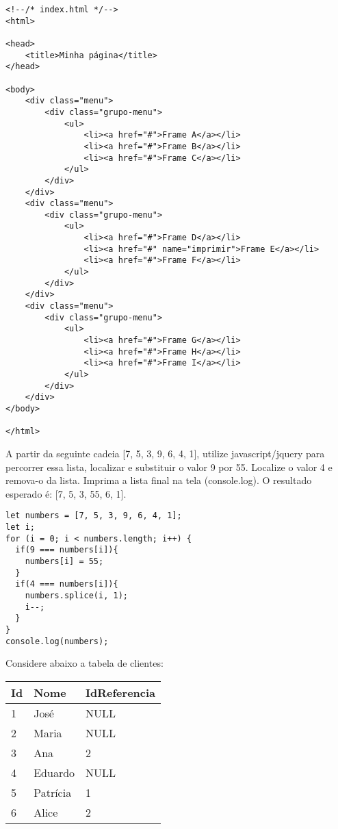 \documentclass[a4 paper]{article}
\begin{document}
\begin{verbatim}
<!--/* index.html */-->
<html>

<head>
    <title>Minha página</title>
</head>

<body>
    <div class="menu">
        <div class="grupo-menu">
            <ul>
                <li><a href="#">Frame A</a></li>
                <li><a href="#">Frame B</a></li>
                <li><a href="#">Frame C</a></li>
            </ul>
        </div>
    </div>
    <div class="menu">
        <div class="grupo-menu">
            <ul>
                <li><a href="#">Frame D</a></li>
                <li><a href="#" name="imprimir">Frame E</a></li>
                <li><a href="#">Frame F</a></li>
            </ul>
        </div>
    </div>
    <div class="menu">
        <div class="grupo-menu">
            <ul>
                <li><a href="#">Frame G</a></li>
                <li><a href="#">Frame H</a></li>
                <li><a href="#">Frame I</a></li>
            </ul>
        </div>
    </div>
</body>

</html>
\end{verbatim}


\vspace{5mm}

A partir da seguinte cadeia [7, 5, 3, 9, 6, 4, 1], utilize javascript/jquery para percorrer essa lista, localizar e substituir o valor 9 por 55. Localize o valor 4 e remova-o da lista. Imprima a lista final na tela (console.log). O resultado esperado é: [7, 5, 3, 55, 6, 1].

\begin{verbatim}
let numbers = [7, 5, 3, 9, 6, 4, 1];
let i;
for (i = 0; i < numbers.length; i++) {
  if(9 === numbers[i]){
  	numbers[i] = 55;
  }
  if(4 === numbers[i]){
  	numbers.splice(i, 1);
    i--;
  }
}
console.log(numbers);
\end{verbatim}

\vspace{5mm}

Considere abaixo a tabela de clientes:

\begin{tabular}{|l|l|l|}
\hline
Id & Nome     & IdReferencia \\ \hline
1  & José     & NULL         \\ \hline
2  & Maria    & NULL         \\ \hline
3  & Ana      & 2            \\ \hline
4  & Eduardo  & NULL         \\ \hline
5  & Patrícia & 1            \\ \hline
6  & Alice    & 2            \\ \hline
\end{tabular}
\end{document}

